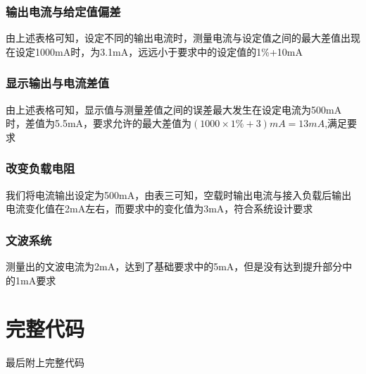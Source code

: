 \documentclass{../source/zjureport}
\begin{document}
            \subsubsection{输出电流与给定值偏差}
            由上述表格可知，设定不同的输出电流时，测量电流与设定值之间的最大差值出现在设定1000mA时，为3.1mA，远远小于要求中的设定值的1\%+10mA
            \subsubsection{显示输出与电流差值}
            由上述表格可知，显示值与测量差值之间的误差最大发生在设定电流为500mA时，差值为5.5mA，要求允许的最大差值为$(1000\times 1\%+3)mA = 13mA$,满足要求
            \subsubsection{改变负载电阻}
            我们将电流输出设定为500mA，由表三可知，空载时输出电流与接入负载后输出电流变化值在2mA左右，而要求中的变化值为3mA，符合系统设计要求
            \subsubsection{文波系统}
            测量出的文波电流为2mA，达到了基础要求中的5mA，但是没有达到提升部分中的1mA要求

            \newpage
        
        \newpage
        \section{完整代码}
        最后附上完整代码
    
    \newpage
\end{document}

